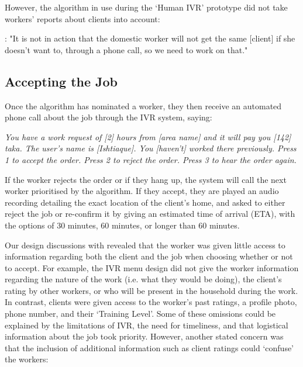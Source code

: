 However, the algorithm in use during the `Human IVR' prototype did not take workers' reports about clients into account: 

\begin{displayquote}
\textbf{\PCTwo{}}: "It is not in action that the domestic worker will not get the same [client] if she doesn't want to, through a phone call, so we need to work on that."
\end{displayquote}


\subsection{Accepting the Job}

Once the algorithm has nominated a worker, they then receive an automated phone call about the job through the IVR system, saying:

\begin{displayquote}
\textit{You have a work request of [2] hours from [area name] and it will pay you [142] taka. The user's name is [Ishtiaque]. You [haven't] worked there previously. Press 1 to accept the order. Press 2 to reject the order. Press 3 to hear the order again.}
\end{displayquote}

If the worker rejects the order or if they hang up, the system will call the next worker prioritised by the algorithm. If they accept, they are played an audio recording detailing the exact location of the client's home, and asked to either reject the job or re-confirm it by giving an estimated time of arrival (ETA), with the options of 30 minutes, 60 minutes, or longer than 60 minutes.

Our design discussions with \PC{} revealed that the worker was given little access to information regarding both the client and the job when choosing whether or not to accept. For example, the IVR menu design did not give the worker information regarding the nature of the work (i.e. what they would be doing), the client's rating by other workers, or who will be present in the household during the work. In contrast, clients were given access to the worker's past ratings, a profile photo, phone number, and their `Training Level'. Some of these omissions could be explained by the limitations of IVR, the need for timeliness, and that logistical information about the job took priority. However, another stated concern was that the inclusion of additional information such as client ratings could `confuse' the workers:

